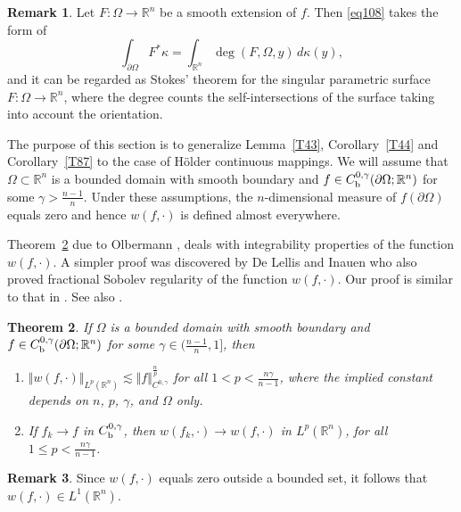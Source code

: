 \documentclass[intlimits,12pt,reqno]{amsart}
\newcommand{\R}{\mathbb R}
\numberwithin{equation}{section}
\def\deg{\operatorname{deg}}
\newtheorem{theorem}{Theorem}[section]
\theoremstyle{definition}
\newtheorem{remark}[theorem]{Remark}
\begin{document}
\begin{remark}
Let $F:\Omega\to\R^n$ be a smooth extension of $f$. Then \eqref{eq108} takes the form of
$$
\int_{\partial\Omega} F^*\kappa=\int_{\R^n}\deg(F,\Omega,y)\, d\kappa(y),
$$
and it can be regarded as Stokes' theorem for the singular parametric surface $F:\Omega\to\R^n$, where the degree counts the self-intersections of the surface taking into account the orientation.
\end{remark}

The purpose of this section is to generalize Lemma~\ref{T43}, Corollary~\ref{T44} and Corollary~\ref{T87} to the case of H\"older continuous mappings. We will assume that $\Omega\subset\R^n$ is a bounded domain with smooth boundary and $f\in C_{\rm b}^{0,\gamma}(\partial\Omega;\R^n)$ for some $\gamma>\frac{n-1}{n}$. Under these assumptions, the $n$-dimensional measure of $f(\partial\Omega)$ equals zero and hence $w(f,\cdot)$ is defined almost everywhere.

Theorem~\ref{T83} due to Olbermann \cite{Olber}, deals with integrability properties of the function $w(f,\cdot)$. A simpler proof was discovered by De Lellis and Inauen \cite{Delellis} who also proved fractional Sobolev regularity of the function $w(f,\cdot)$. Our proof is similar to that in \cite{Delellis}. See also \cite[Theorem~1.3]{ZustGAFA}.
\begin{theorem}
\label{T83}
If $\Omega$ is a bounded domain with smooth boundary and $f\in C_{\rm b}^{0,\gamma}(\partial\Omega;\R^n)$ for some $\gamma\in\big(\frac{n-1}{n},1\big]$, then
\begin{enumerate}
\item[(a)] 
$\Vert w(f,\cdot)\Vert_{L^p(\R^n)}\lesssim\Vert f\Vert_{C^{0,\gamma}}^{\frac{n}{p}}$
for all  $1<p<\frac{n\gamma}{n-1}$,
where the implied constant depends on $n$, $p$, $\gamma$, and $\Omega$ only.
\item[(b)]
If $f_k\to f$ in $C_{\rm b}^{0,\gamma}$, then $w(f_k,\cdot)\to w(f,\cdot)$ in $L^p(\R^n)$, for all $1\leq p<\frac{n\gamma}{n-1}$.
\end{enumerate}
\end{theorem}
\begin{remark}
Since $w(f,\cdot)$ equals zero outside a bounded set, it follows that $w(f,\cdot)\in L^1(\R^n)$.
\end{remark}
\end{document}
